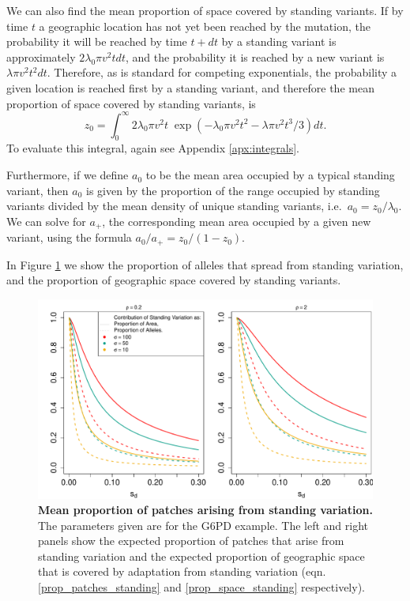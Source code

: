 \documentclass{article}
\begin{document}
We can also find the mean proportion of space covered by standing variants.
If by time $t$ a geographic location has not yet been reached by the mutation,
the probability it will be reached by time $t+dt$ 
by a standing variant is approximately $2 \lambda_0 \pi v^2 t dt$, 
and the probability it is reached by a new variant is $\lambda \pi v^2 t^2 dt$.
Therefore, as is standard for competing exponentials,
the probability a given location is reached first by a standing variant,
and therefore the mean proportion of space covered  by standing variants,
is
\begin{equation} \label{prop_space_standing}
    z_0 = \int_0^\infty {2 \lambda_0 \pi v^2 t} \; \exp \left( - \lambda_0 \pi v^2 t^2 - \lambda \pi v^2 t^3 / 3 \right) dt .
\end{equation}
To evaluate this integral, again see Appendix \ref{apx:integrals}.

Furthermore, if we define $a_0$ to be the mean area occupied by a typical standing variant, 
then $a_0$ is given by the proportion of the range occupied by standing variants divided by the mean density of unique standing variants,
i.e.\ $a_0 = z_0 / \lambda_0$.
We can solve for $a_+$, the corresponding mean area occupied by a given new variant, 
using the formula $a_0 / a_+ = z_0 / (1-z_0)$.

In Figure \ref{G6PD_standing_var_proportion} we show the proportion of
alleles that spread from standing variation, and the proportion of
geographic space covered by standing variants. 

\begin{figure}[ht]
\begin{center}
  \includegraphics[width=1.0\textwidth]{G6PD_standing_var_proportion}
\caption{ %
{\bf Mean proportion of patches arising from standing variation.} The
parameters given are for the G6PD example.
The left and right panels show the expected proportion of patches that
arise from standing variation and the expected proportion of
geographic space that is covered by adaptation from standing variation
(eqn. \eqref{prop_patches_standing} and \eqref{prop_space_standing} respectively).
} \label{G6PD_standing_var_proportion}
\end{center}
\end{figure}
\end{document}
